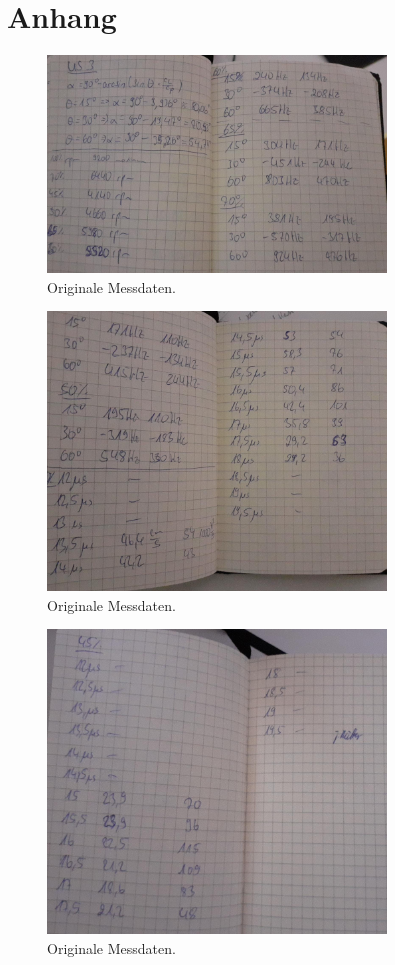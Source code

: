 \section{Anhang}
\begin{figure}[H]
  \centering
  \includegraphics[width=9cm]{content/a1}
  \caption{Originale Messdaten.}
\end{figure}
\begin{figure}[H]
  \centering
  \includegraphics[width=9cm]{content/a2}
  \caption{Originale Messdaten.}
\end{figure}
\begin{figure}[H]
  \centering
  \includegraphics[width=9cm]{content/a3}
  \caption{Originale Messdaten.}
\end{figure}
